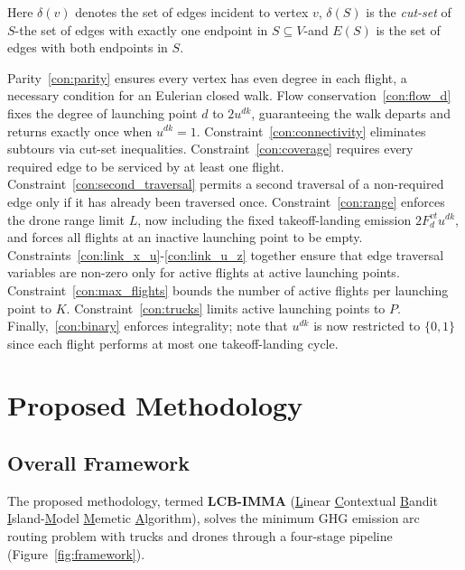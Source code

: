 \documentclass[a4paper,fleqn]{cas-dc}
\begin{document}
Here $\delta(v)$ denotes the set of edges incident to vertex $v$, $\delta(S)$ is the \emph{cut-set} of $S$-the set of edges with exactly one endpoint in $S \subseteq V$-and $E(S)$ is the set of edges with both endpoints in $S$.

Parity~\eqref{con:parity} ensures every vertex has even degree in each flight, a necessary condition for an Eulerian closed walk. Flow conservation~\eqref{con:flow_d} fixes the degree of launching point $d$ to $2u^{dk}$, guaranteeing the walk departs and returns exactly once when $u^{dk}=1$. Constraint~\eqref{con:connectivity} eliminates subtours via cut-set inequalities. Constraint~\eqref{con:coverage} requires every required edge to be serviced by at least one flight. Constraint~\eqref{con:second_traversal} permits a second traversal of a non-required edge only if it has already been traversed once. Constraint~\eqref{con:range} enforces the drone range limit $L$, now including the fixed takeoff-landing emission $2F_d^{vt}u^{dk}$, and forces all flights at an inactive launching point to be empty. Constraints~\eqref{con:link_x_u}-\eqref{con:link_u_z} together ensure that edge traversal variables are non-zero only for active flights at active launching points. Constraint~\eqref{con:max_flights} bounds the number of active flights per launching point to $K$. Constraint~\eqref{con:trucks} limits active launching points to $P$. Finally,~\eqref{con:binary} enforces integrality; note that $u^{dk}$ is now restricted to $\{0,1\}$ since each flight performs at most one takeoff-landing cycle.

\section{Proposed Methodology}\label{sec:method}

\subsection{Overall Framework}\label{sec:workflow}

The proposed methodology, termed \textbf{LCB-IMMA} (\underline{L}inear \underline{C}ontextual \underline{B}andit \underline{I}sland-\underline{M}odel \underline{M}emetic \underline{A}lgorithm), solves the minimum GHG emission arc routing problem with trucks and drones through a four-stage pipeline (Figure~\ref{fig:framework}).
\end{document}
